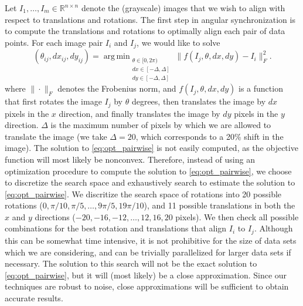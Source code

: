 \documentclass[11pt]{article}
\DeclareMathOperator*{\argmin}{arg\,min}
\begin{document}
Let $I_1, \dots, I_m \in \mathbb{R}^{n \times n}$ denote the (grayscale) images that we wish to align with respect to translations and rotations.
%
The first step in angular synchronization is to compute the translations and rotations to optimally align each pair of data points. 
%
For each image pair $I_i$ and $I_j$, we would like to solve
\begin{equation}\label{eq:opt_pairwise}
(\theta_{ij}, dx_{ij}, dy_{ij}) = \argmin_{
\begin{matrix}
\theta \in [0, 2\pi) \\ 
dx \in [-\Delta, \Delta]\\ 
dy \in [-\Delta, \Delta]
\end{matrix}
} \|f(I_j, \theta, dx, dy) - I_i \|_F^2.
\end{equation}
where $\| \cdot \|_F$ denotes the Frobenius norm, and $f(I_j, \theta, dx, dy)$ is a function that first rotates the image $I_j$ by $\theta$ degrees, then translates the image by $dx$ pixels in the $x$ direction, and finally translates the image by $dy$ pixels in the $y$ direction. 
%
$\Delta$ is the maximum number of pixels by which we are allowed to translate the image (we take $\Delta=20$, which corresponds to a 20\% shift in the image). 
%
The solution to \eqref{eq:opt_pairwise} is not easily computed, as the objective function will most likely be nonconvex.
%
Therefore, instead of using an optimization procedure to compute the solution to \eqref{eq:opt_pairwise}, we choose to discretize the search space and exhaustively search to estimate the solution to \eqref{eq:opt_pairwise}.
%
We discritize the search space of rotations into 20 possible rotations ($0, \pi/10, \pi/5, \dots, 9 \pi/5, 19\pi/10$), and 11 possible translations in both the $x$ and $y$ directions ($-20, -16, -12, \dots, 12, 16, 20$ pixels). 
%
We then check all possible combinations for the best rotation and translations that align $I_i$ to $I_j$. 
%
Although this can be somewhat time intensive, it is not prohibitive for the size of data sets which we are considering, and can be trivially parallelized for larger data sets if necessary.
%
The solution to this search will not be the exact solution to \eqref{eq:opt_pairwise}, but it will (most likely) be a close approximation.
%
Since our techniques are robust to noise, close approximations will be sufficient to obtain accurate results.
\end{document}
